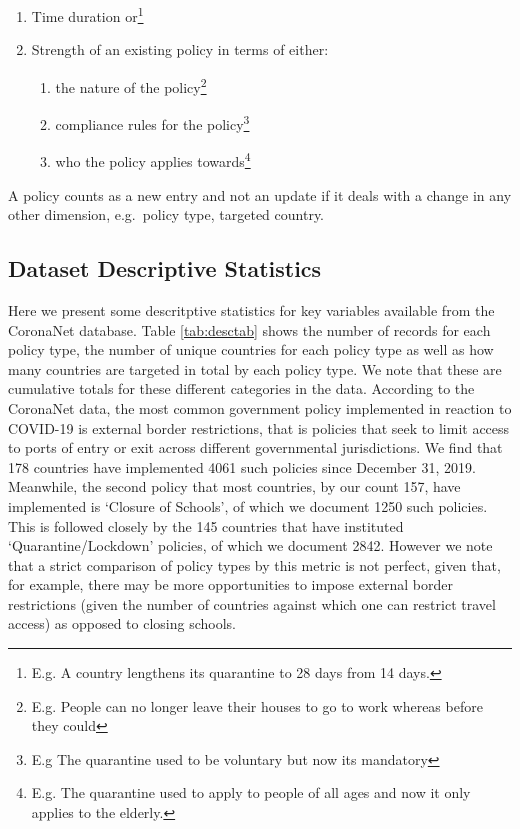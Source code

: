 \documentclass[]{article}
\providecommand{\tightlist}{%
  \setlength{\itemsep}{0pt}\setlength{\parskip}{0pt}}
\let\rmarkdownfootnote\footnote%
\def\footnote{\protect\rmarkdownfootnote}
\begin{document}
\begin{enumerate}
\def\labelenumi{\arabic{enumi}.}
\tightlist
\item
  Time duration or\footnote{E.g. A country lengthens its quarantine to 28 days from 14 days.}
\item
  Strength of an existing policy in terms of either:

  \begin{enumerate}
  \def\labelenumii{\alph{enumii}.}
  \tightlist
  \item
    the nature of the policy\footnote{E.g. People can no longer leave their houses to go to work whereas before they could}
  \item
    compliance rules for the policy\footnote{E.g The quarantine used to be voluntary but now its mandatory}
  \item
    who the policy applies towards\footnote{E.g. The quarantine used to apply to people of all ages and now it only applies to the elderly.}
  \end{enumerate}
\end{enumerate}

A policy counts as a new entry and not an update if it deals with a change in any other dimension, e.g.~policy type, targeted country.

\hypertarget{dataset-descriptive-statistics}{%
\subsection{Dataset Descriptive Statistics}\label{dataset-descriptive-statistics}}

Here we present some descritptive statistics for key variables available from the CoronaNet database. Table \ref{tab:desctab} shows the number of records for each policy type, the number of unique countries for each policy type as well as how many countries are targeted in total by each policy type. We note that these are cumulative totals for these different categories in the data. According to the CoronaNet data, the most common government policy implemented in reaction to COVID-19 is external border restrictions, that is policies that seek to limit access to ports of entry or exit across different governmental jurisdictions. We find that 178 countries have implemented 4061 such policies since December 31, 2019. Meanwhile, the second policy that most countries, by our count 157, have implemented is `Closure of Schools', of which we document 1250 such policies. This is followed closely by the 145 countries that have instituted `Quarantine/Lockdown' policies, of which we document 2842. However we note that a strict comparison of policy types by this metric is not perfect, given that, for example, there may be more opportunities to impose external border restrictions (given the number of countries against which one can restrict travel access) as opposed to closing schools.
\end{document}
